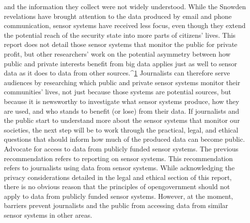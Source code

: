 \begin{itemize}
and the information they collect were not widely understood. While the
Snowden revelations have brought attention to the data produced by email
and phone communication, sensor systems have received less focus, even
though they extend the potential reach of the security state into more parts
of citizens' lives.
This report does not detail those sensor systems that monitor the public for
private profit, but other researchers' work on the potential asymmetry
between how public and private interests benefit from big data applies just
as well to sensor data as it does to data from other sources.^{\href{#endnotes-stauffer}{1}} Journalists can
therefore serve audiences by researching which public and private sensor
systems monitor their communities' lives, not just because those systems
are potential sources, but because it is newsworthy to investigate what sensor
systems produce, how they are used, and who stands to benefit (or lose)
from their data. If journalists and the public start to understand more about
the sensor systems that monitor our societies, the next step will be to work
through the practical, legal, and ethical questions that should inform how
much of the produced data can become public.
Advocate for access to data from publicly funded sensor systems.
The previous recommendation refers to reporting on sensor systems. This
recommendation refers to journalists using data from sensor systems. While
acknowledging the privacy considerations detailed in the legal and ethical
section of this report, there is no obvious reason that the principles of opengovernment
should not apply to data from publicly funded sensor systems.
However, at the moment, barriers prevent journalists and the public from
accessing data from similar sensor systems in other areas.


\end{itemize}

